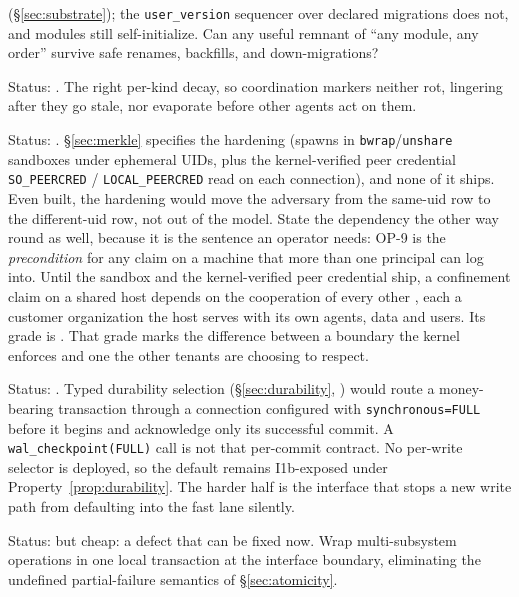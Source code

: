\documentclass[11pt,a4paper]{article}
\theoremstyle{definition}
\theoremstyle{remark}
\begin{document}
\begin{description}[leftmargin=2.2em,style=nextline]
(\S\ref{sec:substrate}); the \texttt{user\_version} sequencer over declared
migrations does not, and modules still self-initialize. Can any useful remnant of
``any module, any order'' survive safe renames, backfills, and down-migrations?
\item[$\bigstar$ OP-8: Stigmergic decay calibration.] Status: \Open. The right per-kind
decay, so coordination markers neither rot, lingering after they go stale, nor evaporate before other agents act on them.
\item[$\bigstar$ OP-9: Same-machine adversary.] Status: \Open. \S\ref{sec:merkle}
specifies the hardening (spawns in \texttt{bwrap}/\texttt{unshare} sandboxes
under ephemeral UIDs, plus the kernel-verified peer credential
\texttt{SO\_PEERCRED} / \texttt{LOCAL\_PEERCRED} read on each connection), and
none of it ships. Even built, the
hardening would move the adversary from the same-uid row to the different-uid row,
not out of the model. State the dependency the other way round as well, because it
is the sentence an operator needs: OP-9 is the \emph{precondition} for any
 claim on a machine that more than one principal can log into.
Until the sandbox and the kernel-verified peer credential ship, a confinement claim
on a shared host depends on the cooperation of every other , each
a customer organization the host serves with its own agents, data and users.
Its grade is . That grade marks the difference between a boundary the
kernel enforces and one the other tenants are choosing to respect.
\item[$\bigstar$ OP-10: Per-write-path durability.] Status: \Open. Typed durability
selection (\S\ref{sec:durability}, \Designed) would route a money-bearing
transaction through a connection configured with \texttt{synchronous=FULL}
before it begins and acknowledge only its successful commit. A
\texttt{wal\_checkpoint(FULL)} call is not that per-commit contract. No
per-write selector is deployed, so the default remains I1b-exposed under
Property~\ref{prop:durability}.
The harder half is the interface that stops a new write path from defaulting into
the fast lane silently.
\item[$\bigstar$ OP-11: Cross-subsystem atomicity by default.] Status: \Open{} but cheap:
a defect that can be fixed now. Wrap multi-subsystem operations in one local
transaction at the interface boundary, eliminating the undefined partial-failure
semantics of \S\ref{sec:atomicity}.
\end{description}
\end{document}
